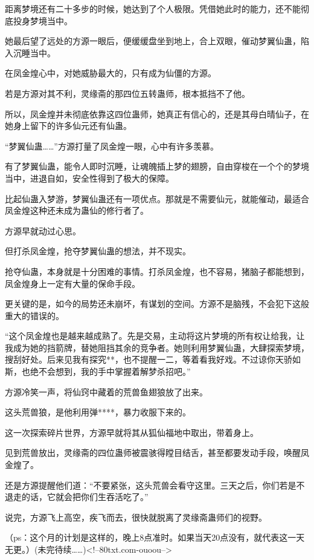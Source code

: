 \begin{this_body}
距离梦境还有二十多步的时候，她达到了个人极限。凭借她此时的能力，还不能彻底投身梦境当中。

她最后望了远处的方源一眼后，便缓缓盘坐到地上，合上双眼，催动梦翼仙蛊，陷入沉睡当中。

在凤金煌心中，对她威胁最大的，只有成为仙僵的方源。

若是方源对其不利，灵缘斋的那四位五转蛊师，根本抵挡不了他。

所以，凤金煌并未彻底依靠这四位蛊师，她真正有信心的，还是其母白晴仙子，在她身上留下的许多仙元还有仙蛊。

“梦翼仙蛊……”方源打量了凤金煌一眼，心中有许多羡慕。

有了梦翼仙蛊，能令人即时沉睡，让魂魄插上梦的翅膀，自由穿梭在一个个的梦境当中，进退自如，安全性得到了极大的保障。

比起仙蛊入梦游，梦翼仙蛊还有一项优点。那就是不需要仙元，就能催动，最适合凤金煌这种还未成为蛊仙的修行者了。

方源早就动过心思。

但打杀凤金煌，抢夺梦翼仙蛊的想法，并不现实。

抢夺仙蛊，本身就是十分困难的事情。打杀凤金煌，也不容易，猪脑子都能想到，凤金煌身上一定有大量的保命手段。

更关键的是，如今的局势还未崩坏，有谋划的空间。方源不是脑残，不会犯下这般重大的错误的。

“这个凤金煌也是越来越成熟了。先是交易，主动将这片梦境的所有权让给我，让我成为她的挡箭牌，替她阻挡其余的竞争者。她则利用梦翼仙蛊，大肆探索梦境，搜刮好处。后来见我有探究**，也不提醒一二，等着看我好戏。不过谅你天骄如斯，也绝不会想到，我的手中掌握着解梦杀招吧。”

方源冷笑一声，将仙窍中藏着的荒兽鱼翅狼放了出来。

这头荒兽狼，是他利用弹****，暴力收服下来的。

这一次探索碎片世界，方源早就将其从狐仙福地中取出，带着身上。

见到荒兽放出，灵缘斋的四位蛊师被震骇得瞠目结舌，甚至都要发动手段，唤醒凤金煌了。

还是方源提醒他们道：“不要紧张，这头荒兽会看守这里。三天之后，你们若是不退走的话，它就会把你们生吞活吃了。”

说完，方源飞上高空，疾飞而去，很快就脱离了灵缘斋蛊师们的视野。

（ps：这个月的计划是这样的，晚上8点准时。如果当天20点没有，就代表这一天无更。）(未完待续……)<!--80txt.com-ouoou-->

\end{this_body}

